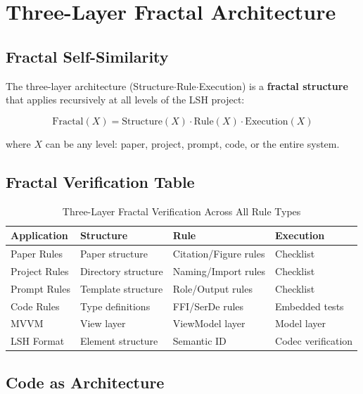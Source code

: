 \documentclass{article}
\begin{document}
\section{Three-Layer Fractal Architecture}

\subsection{Fractal Self-Similarity}

The three-layer architecture (Structure$\cdot$Rule$\cdot$Execution) is a \textbf{fractal structure} that applies recursively at all levels of the LSH project:

\begin{equation}
\label{eq:fractal}
\text{Fractal}(X) = \text{Structure}(X) \cdot \text{Rule}(X) \cdot \text{Execution}(X)
\end{equation}

where $X$ can be any level: paper, project, prompt, code, or the entire system.

\subsection{Fractal Verification Table}

\begin{table}[h]
\centering
\caption{Three-Layer Fractal Verification Across All Rule Types}
\label{tab:fractal-verification}
\begin{tabular}{l|l|l|l}
\toprule
\textbf{Application} & \textbf{Structure} & \textbf{Rule} & \textbf{Execution} \\
\midrule
Paper Rules & Paper structure & Citation/Figure rules & Checklist \\
Project Rules & Directory structure & Naming/Import rules & Checklist \\
Prompt Rules & Template structure & Role/Output rules & Checklist \\
Code Rules & Type definitions & FFI/SerDe rules & Embedded tests \\
MVVM & View layer & ViewModel layer & Model layer \\
LSH Format & Element structure & Semantic ID & Codec verification \\
\bottomrule
\end{tabular}
\end{table}

\subsection{Code as Architecture}
\end{document}

